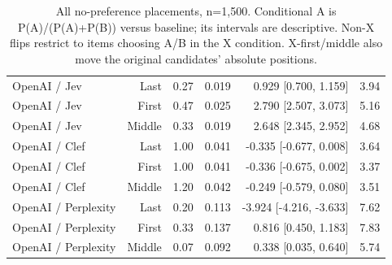\begin{table}[t]
\begin{tabular}{@{}lrrrrr@{}}
OpenAI / Jev & Last & 0.27 & 0.019 & 0.929 [0.700, 1.159] & 3.94 \\
OpenAI / Jev & First & 0.47 & 0.025 & 2.790 [2.507, 3.073] & 5.16 \\
OpenAI / Jev & Middle & 0.33 & 0.019 & 2.648 [2.345, 2.952] & 4.68 \\
OpenAI / Clef & Last & 1.00 & 0.041 & -0.335 [-0.677, 0.008] & 3.64 \\
OpenAI / Clef & First & 1.00 & 0.041 & -0.336 [-0.675, 0.002] & 3.37 \\
OpenAI / Clef & Middle & 1.20 & 0.042 & -0.249 [-0.579, 0.080] & 3.51 \\
OpenAI / Perplexity & Last & 0.20 & 0.113 & -3.924 [-4.216, -3.633] & 7.62 \\
OpenAI / Perplexity & First & 0.33 & 0.137 & 0.816 [0.450, 1.183] & 7.83 \\
OpenAI / Perplexity & Middle & 0.07 & 0.092 & 0.338 [0.035, 0.640] & 5.74 \\
\bottomrule
\end{tabular}
\caption{All no-preference placements, n=1,500. Conditional A is P(A)/(P(A)+P(B)) versus baseline; its intervals are descriptive. Non-X flips restrict to items choosing A/B in the X condition. X-first/middle also move the original candidates' absolute positions.}
\label{tab:appendix_tie_placement}
\end{table}
